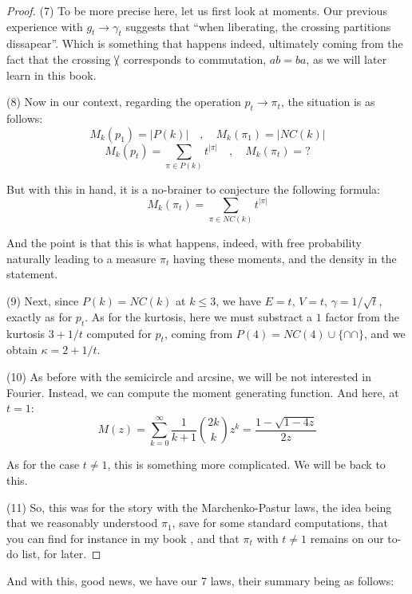 \documentclass[12pt]{amsbook}
\begin{document}
\begin{proof}
\medskip

(7) To be more precise here, let us first look at moments. Our previous experience with $g_t\to\gamma_t$ suggests that ``when liberating, the crossing partitions dissapear''. Which is something that happens indeed, ultimately coming from the fact that the crossing $\slash\hskip-2.1mm\backslash$ corresponds to commutation, $ab=ba$, as we will later learn in this book. 

\medskip

(8) Now in our context, regarding the operation $p_t\to\pi_t$, the situation is as follows:
$$M_k(p_1)=|P(k)|\quad,\quad M_k(\pi_1)=|NC(k)|$$
$$M_k(p_t)=\sum_{\pi\in P(k)}t^{|\pi|}
\quad,\quad M_k(\pi_t)=?$$

But with this in hand, it is a no-brainer to conjecture the following formula:
$$M_k(\pi_t)=\sum_{\pi\in NC(k)}t^{|\pi|}$$

And the point is that this is what happens, indeed, with free probability naturally leading to a measure $\pi_t$ having these moments, and the density in the statement.

\medskip

(9) Next, since $P(k)=NC(k)$ at $k\leq 3$, we have $E=t$, $V=t$, $\gamma=1/\sqrt{t}$, exactly as for $p_t$. As for the kurtosis, here we must substract a $1$ factor from the kurtosis $3+1/t$ computed for $p_t$, coming from $P(4)=NC(4)\cup\{\cap\!\!\cap\}$, and we obtain $\kappa=2+1/t$.

\medskip

(10) As before with the semicircle and arcsine, we will be not interested in Fourier. Instead, we can compute the moment generating function. And here, at $t=1$:
$$M(z)=\sum_{k=0}^\infty\frac{1}{k+1}\binom{2k}{k}z^k
=\frac{1-\sqrt{1-4z}}{2z}$$

As for the case $t\neq1$, this is something more complicated. We will be back to this.

\medskip

(11) So, this was for the story with the Marchenko-Pastur laws, the idea being that we reasonably understood $\pi_1$, save for some standard computations, that you can find for instance in my book \cite{ba2}, and that $\pi_t$ with $t\neq1$ remains on our to-do list, for later.
\end{proof}

And with this, good news, we have our 7 laws, their summary being as follows:
\end{document}
